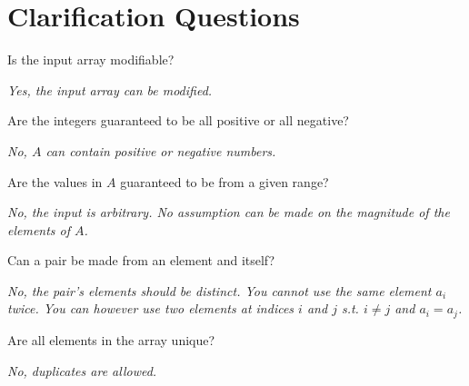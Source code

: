 \section{Clarification Questions}
\begin{QandA}
	\begin{questionitem} \begin{question} Is the input array modifiable?  \end{question} 	 
    \begin{answered}
		\textit{Yes, the input array can be modified.}
	\end{answered} \end{questionitem}	
	\begin{questionitem} \begin{question} Are the integers guaranteed to be all positive or all negative?   \end{question} 	 
    \begin{answered}
		\textit{No, $A$ can contain positive or negative numbers.}
	\end{answered} \end{questionitem}
	\begin{questionitem} \begin{question} Are the values in $A$ guaranteed to be from a given range?  \end{question} 	 
    \begin{answered}
		\textit{No, the input is arbitrary. No assumption can be made on the magnitude of the elements of $A$.}
	\end{answered} \end{questionitem}
	\begin{questionitem} \begin{question} Can a pair be made from an element and itself?  \end{question} 	 
    \begin{answered}
		\textit{No, the pair's elements should be distinct. You cannot use the same element $a_i$ twice. You can however use two elements at indices $i$ and $j$ s.t. $i \neq j$ and $a_i=a_j$.}
	\end{answered} \end{questionitem}
	\begin{questionitem} \begin{question} Are all elements in the array unique?  \end{question} 	 
    \begin{answered}
		\textit{No, duplicates are allowed.}
	\end{answered} \end{questionitem}

\end{QandA}
